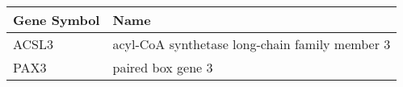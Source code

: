 \begin{tabular}{ll}
\toprule
Gene Symbol &                                           Name \\
\midrule
      ACSL3 & acyl-CoA synthetase long-chain family member 3 \\
       PAX3 &                              paired box gene 3 \\
\bottomrule
\end{tabular}
